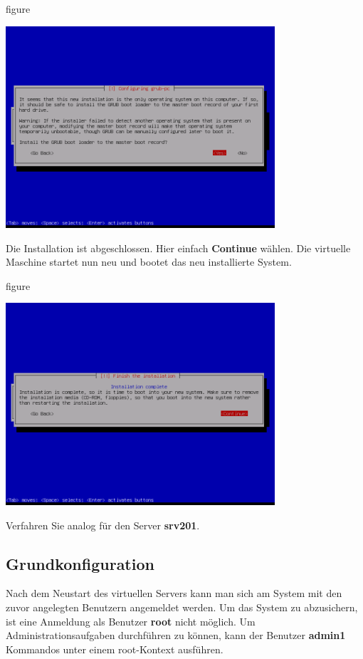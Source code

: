 \begin{nofloat}{figure}
\begin{center}
\includegraphics[width=0.75\textwidth]{screenshots/34_ubuntu_install.png}
\end{center}
\end{nofloat}
\newpage
Die Installation ist abgeschlossen. Hier einfach \textbf{Continue} wählen. Die
virtuelle Maschine startet nun neu und bootet das neu installierte System.

\begin{nofloat}{figure}
\begin{center}
\includegraphics[width=0.75\textwidth]{screenshots/35_ubuntu_install.png}
\end{center}
\end{nofloat}

Verfahren Sie analog für den Server \textbf{srv201}.

\subsection{Grundkonfiguration}
Nach dem Neustart des virtuellen Servers kann man sich am System mit den zuvor
angelegten Benutzern angemeldet werden. Um das System zu abzusichern, ist eine
Anmeldung als Benutzer \textbf{root} nicht möglich. Um Administrationsaufgaben
durchführen zu können, kann der Benutzer \textbf{admin1} Kommandos unter einem
root-Kontext ausführen.

